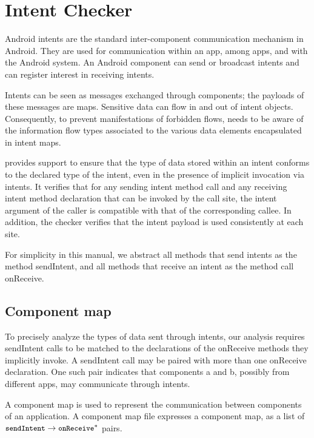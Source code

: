 \htmlhr

\newcommand{\tp}[1]{\mathit{typeof}}
\newcommand{\Fix}[1]{\textbf{[[}{\color{red} #1}\textbf{]]}}


\chapter{Intent Checker\label{intent-checker}}

Android intents are the standard inter-component communication
mechanism in Android.  They are used for communication within an app,
among apps, and with the Android system.  An Android component can
send or broadcast intents and can register interest in receiving
intents.

Intents can be seen as messages exchanged through components; the
payloads of these messages are maps.  Sensitive data can flow in and
out of intent objects.  Consequently, to prevent manifestations of
forbidden flows, \theFlowChecker{} needs to be aware of the
information flow types associated to the various data elements
encapsulated in intent maps.

\TheFlowChecker{} provides support to
ensure that the type of data stored within an intent conforms to the
declared type of the intent, even in the presence of implicit
invocation via intents.  It verifies that for any sending intent
method call and any receiving intent method declaration that can be
invoked by the call site, the intent argument of the caller is
compatible with that of the corresponding callee.  In addition, the
checker verifies that the intent payload is used consistently at each
site.

For simplicity in this manual, we abstract all methods that send intents as the
method sendIntent, and all methods that receive an intent as the method call
onReceive.  

\section{Component map}
To precisely analyze the types of data sent through intents, our analysis
requires sendIntent calls to be matched to the declarations of the onReceive
methods they implicitly invoke. A sendIntent call may be paired
with more than one onReceive declaration. One such pair indicates that 
components a and b, possibly from different apps, may communicate through 
intents. 

A component map is used to represent the communication between components of an
application. A component map file expresses a 
component map, as a list of $\flow{\|sendIntent|}{\|onReceive|^*}$ pairs.

